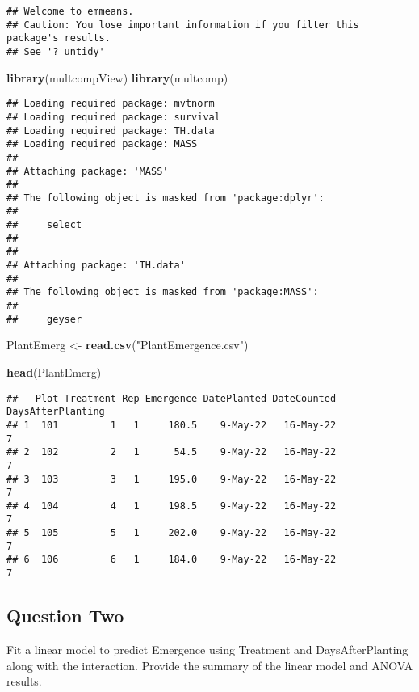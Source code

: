\documentclass[
  12pt,
]{article}
\newenvironment{Shaded}{\begin{snugshade}}{\end{snugshade}}
\newcommand{\FunctionTok}[1]{\textcolor[rgb]{0.13,0.29,0.53}{\textbf{#1}}}
\newcommand{\NormalTok}[1]{#1}
\newcommand{\OtherTok}[1]{\textcolor[rgb]{0.56,0.35,0.01}{#1}}
\newcommand{\StringTok}[1]{\textcolor[rgb]{0.31,0.60,0.02}{#1}}
\begin{document}
\begin{verbatim}
## Welcome to emmeans.
## Caution: You lose important information if you filter this package's results.
## See '? untidy'
\end{verbatim}

\begin{Shaded}
\begin{Highlighting}[]
\FunctionTok{library}\NormalTok{(multcompView)}
\FunctionTok{library}\NormalTok{(multcomp)}
\end{Highlighting}
\end{Shaded}

\begin{verbatim}
## Loading required package: mvtnorm
## Loading required package: survival
## Loading required package: TH.data
## Loading required package: MASS
## 
## Attaching package: 'MASS'
## 
## The following object is masked from 'package:dplyr':
## 
##     select
## 
## 
## Attaching package: 'TH.data'
## 
## The following object is masked from 'package:MASS':
## 
##     geyser
\end{verbatim}

\begin{Shaded}
\begin{Highlighting}[]
\NormalTok{PlantEmerg }\OtherTok{\textless{}{-}} \FunctionTok{read.csv}\NormalTok{(}\StringTok{"PlantEmergence.csv"}\NormalTok{)}

\FunctionTok{head}\NormalTok{(PlantEmerg)}
\end{Highlighting}
\end{Shaded}

\begin{verbatim}
##   Plot Treatment Rep Emergence DatePlanted DateCounted DaysAfterPlanting
## 1  101         1   1     180.5    9-May-22   16-May-22                 7
## 2  102         2   1      54.5    9-May-22   16-May-22                 7
## 3  103         3   1     195.0    9-May-22   16-May-22                 7
## 4  104         4   1     198.5    9-May-22   16-May-22                 7
## 5  105         5   1     202.0    9-May-22   16-May-22                 7
## 6  106         6   1     184.0    9-May-22   16-May-22                 7
\end{verbatim}

\subsection{Question Two}\label{question-two}

Fit a linear model to predict Emergence using Treatment and
DaysAfterPlanting along with the interaction. Provide the summary of the
linear model and ANOVA results.
\end{document}
